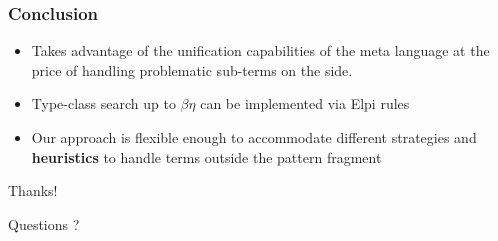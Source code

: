 \documentclass{pres}
\begin{document}
\begin{frame}
  \frametitle{Conclusion}

  \begin{itemize}
    \item Takes advantage of the unification capabilities of the meta language
          at the price of handling problematic sub-terms on the side.
    \item Type-class search up to $\beta\eta$ can be implemented via Elpi rules
    \item Our approach is flexible enough to accommodate different strategies
          and \textbf{heuristics} to handle terms outside the pattern fragment
  \end{itemize}

\end{frame}

\begin{frame}

  \centering
    {\Huge\calligra Thanks!}

  \pause
  \begin{center}
    Questions ?
  \end{center}

\end{frame}
\end{document}
